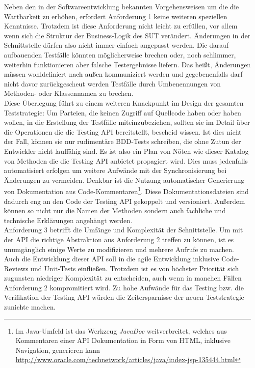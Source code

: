 Neben den in der Softwareentwicklung bekannten Vorgehensweisen um die die Wartbarkeit zu erhöhen, erfordert Anforderung 1 keine weiteren speziellen Kenntnisse. Trotzdem ist diese Anforderung nicht leicht zu erfüllen, vor allem wenn sich die Struktur der Business-Logik des \Gls{SUT} verändert. Änderungen in der Schnittstelle dürfen also nicht immer einfach angepasst werden. Die darauf aufbauenden Testfälle könnten möglicherweise brechen oder, noch schlimmer, weiterhin funktionieren aber falsche Testergebnisse liefern. Das heißt, Änderungen müssen wohldefiniert nach außen kommuniziert werden und gegebenenfalls darf nicht davor zurückgescheut werden Testfälle durch Umbenennungen von Methoden- oder Klassennamen zu brechen.\\
Diese Überlegung führt zu einem weiteren Knackpunkt im Design der gesamten Teststrategie: Um Parteien, die keinen Zugriff auf Quellcode haben oder haben wollen, in die Erstellung der Testfälle miteinzubeziehen, sollten sie im Detail über die Operationen die die Testing API bereitstellt, bescheid wissen. Ist dies nicht der Fall, können sie nur rudimentäre BDD-Tests schreiben, die ohne Zutun der Entwickler nicht lauffähig sind. Es ist also ein Plan von Nöten wie dieser Katalog von Methoden die die Testing API anbietet propagiert wird. Dies muss jedenfalls automatisiert erfolgen um weitere Aufwände mit der Synchronisierung bei Änderungen zu vermeiden. Denkbar ist die Nutzung automatischer Generierung von Dokumentation aus Code-Kommentaren\footnote{Im Java-Umfeld ist das Werkzeug \textit{JavaDoc} weitverbreitet, welches aus Kommentaren einer API Dokumentation in Form von HTML, inklusive Navigation, generieren kann \url{http://www.oracle.com/technetwork/articles/java/index-jsp-135444.html}}. Diese Dokumentationsdateien sind dadurch eng an den Code der Testing API gekoppelt und versioniert. Außerdem können so nicht nur die Namen der Methoden sondern auch fachliche und technische Erklärungen angehängt werden.\\
Anforderung 3 betrifft die Umfänge und Komplexität der Schnittstelle. Um mit der API die richtige Abstraktion aus Anforderung 2 treffen zu können, ist es unumgänglich einige Werte zu modifizieren und mehrere Aufrufe zu machen. Auch die Entwicklung dieser API soll in die agile Entwicklung inklusive Code-Reviews und Unit-Tests einfließen. Trotzdem ist es von höchster Priorität sich zugunsten niedriger Komplexität zu entscheiden, auch wenn in manchen Fällen Anforderung 2 kompromitiert wird. Zu hohe Aufwände für das Testing bzw. die Verifikation der Testing API würden die Zeitersparnisse der neuen Teststrategie zunichte machen.

